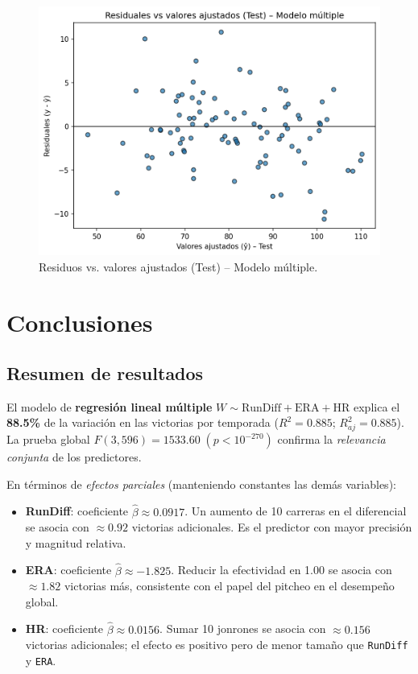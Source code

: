\documentclass[man,floatsintext]{apa7}
\begin{document}
\begin{figure}[H]
    \centering
    \includegraphics[width=0.8\linewidth]{../plots/final_version/forecast_residuals_vs_fitted_test.png}
    \caption{Residuos vs. valores ajustados (Test) – Modelo múltiple.}
    \label{fig:resid_fitted_test}
\end{figure}
\section{Conclusiones}
\subsection{Resumen de resultados}
El modelo de \textbf{regresión lineal múltiple} \(W \sim \text{RunDiff} + \text{ERA} + \text{HR}\) explica el \textbf{88.5\%} de la variación en las victorias por temporada (\(R^2=0.885\); \(R^2_{aj}=0.885\)). La prueba global \(F(3,596)=1533.60\; (p<10^{-270})\) confirma la \emph{relevancia conjunta} de los predictores.

En términos de \emph{efectos parciales} (manteniendo constantes las demás variables):
\begin{itemize}
    \item \textbf{RunDiff}: coeficiente \(\hat\beta\approx0.0917\). Un aumento de 10 carreras en el diferencial se asocia con \(\approx0.92\) victorias adicionales. Es el predictor con mayor precisión y magnitud relativa.
    \item \textbf{ERA}: coeficiente \(\hat\beta\approx-1.825\). Reducir la efectividad en 1.00 se asocia con \(\approx1.82\) victorias más, consistente con el papel del pitcheo en el desempeño global.
    \item \textbf{HR}: coeficiente \(\hat\beta\approx0.0156\). Sumar 10 jonrones se asocia con \(\approx0.156\) victorias adicionales; el efecto es positivo pero de menor tamaño que \texttt{RunDiff} y \texttt{ERA}.
\end{itemize}
\end{document}
